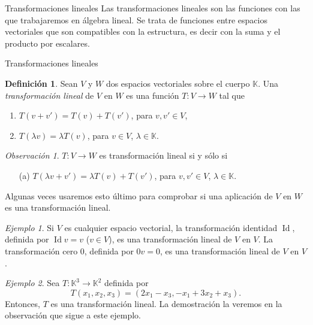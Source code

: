 \documentclass[a4paper,12pt,twoside,spanish,reqno]{amsbook}
\numberwithin{equation}{section}
\theoremstyle{definition}
\newtheorem{definicion}[teorema]{Definici\'on}
\theoremstyle{remark}
\newtheorem*{ejemplo*}{Ejemplo}
\newtheorem*{obs*}{Observaci\'on}
\newcommand{\Id}{\operatorname{Id}}
\newcommand{\K}{\mathbb K}
\begin{document}
        
    \begin{chapter}{Transformaciones lineales}\label{chap-trans-lin}
        Las transformaciones lineales son las funciones con las que trabajaremos en álgebra lineal. Se trata de funciones entre espacios vectoriales que son compatibles con la estructura,  es decir con la suma y el producto por escalares.
        
        
        \begin{section}{Transformaciones lineales}\label{seccion-transformaciones-lineales}
            \begin{definicion}
                Sean $V$ y $W$ dos espacios vectoriales sobre el cuerpo $\K$. Una 				\textit{transformación lineal} de $V$ en $W$ es una función $T:V \to W$  tal que
                \begin{enumerate}
                    \item $T(v+v') = T(v)+ T(v')$, para $v,v' \in V$,
                    \item $T(\lambda v) = \lambda T(v)$, para $v \in V$, $\lambda \in \K$.
                \end{enumerate}
            \end{definicion}
        
            \begin{obs*}
                $T:V \to W$ es transformación lineal si y sólo si
                \begin{enumerate}
                    \item[({a})]  $T(\lambda v+v') = \lambda T(v)+ T(v')$, para $v,v' \in V$, $\lambda \in \K$.
                \end{enumerate}
            Algunas veces usaremos esto último para comprobar si una aplicación de $V$ en $W$ es una transformación lineal. 
            \end{obs*}
            
            \begin{ejemplo*}
                Si $V$ es cualquier espacio vectorial, la transformación identidad $\Id$, definida por $\Id v = v$ ($v \in V$), es una transformación lineal de $V$ en $V$. La transformación cero $0$, definida por $0v = 0$, es una transformación lineal de $V$ en $V$.
            \end{ejemplo*}
        
            \begin{ejemplo*}
                Sea $T : \K^3 \to \K^2$ definida por
                $$
                T(x_1,x_2,x_3) = (2x_1 - x_3, -x_1+3x_2+x_3).
                $$
                Entonces, $T$  es una transformación lineal. La demostración la veremos en la observación que sigue a este ejemplo. 
                

\end{ejemplo*}
\end{section}
\end{chapter}
\end{document}
